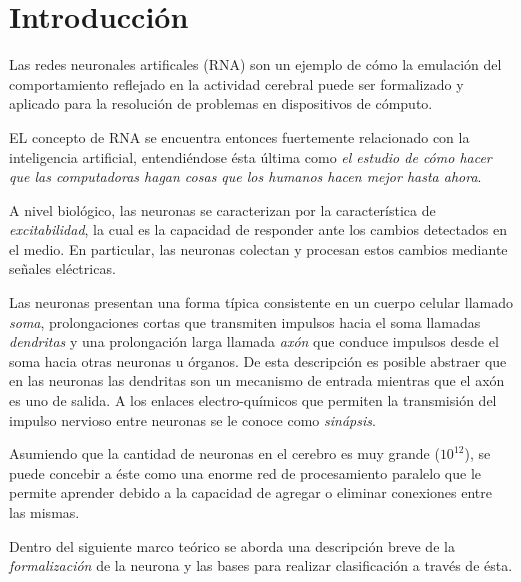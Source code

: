 \documentclass[journal]{IEEEtran}
\begin{document}
\section{Introducción}
\label{sec:introduccion}

Las redes neuronales artificales (RNA) son un ejemplo de cómo la emulación del comportamiento reflejado en la actividad cerebral puede ser formalizado y aplicado para la resolución de problemas en dispositivos de cómputo.

EL concepto de RNA se encuentra entonces fuertemente relacionado con la inteligencia artificial, entendiéndose ésta última como \emph{el estudio de cómo hacer que las computadoras hagan cosas que los humanos hacen mejor hasta ahora}.

A nivel biológico, las neuronas se caracterizan por la característica de \emph{excitabilidad}, la cual es la capacidad de responder ante los cambios detectados en el medio.
En particular, las neuronas colectan y procesan estos cambios mediante señales eléctricas.

Las neuronas presentan una forma típica consistente en un cuerpo celular llamado \emph{soma}, prolongaciones cortas que transmiten impulsos hacia el soma llamadas \emph{dendritas} y una prolongación larga llamada \emph{axón} que conduce impulsos desde el soma hacia otras neuronas u órganos.
De esta descripción es posible abstraer que en las neuronas las dendritas son un mecanismo de entrada mientras que el axón es uno de salida.
A los enlaces electro-químicos que permiten la transmisión del impulso nervioso entre neuronas se le conoce como \emph{sinápsis}.

Asumiendo que la cantidad de neuronas en el cerebro es muy grande ($10^{12}$), se puede concebir a éste como una enorme red de procesamiento paralelo que le permite aprender debido a la capacidad de agregar o eliminar conexiones entre las mismas. 

Dentro del siguiente marco teórico se aborda una descripción breve de la \emph{formalización} de la neurona y las bases para realizar clasificación a través de ésta.
\end{document}
